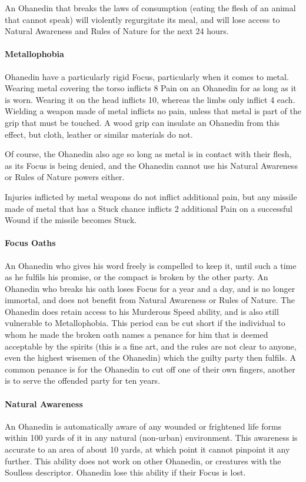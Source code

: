 \documentclass[oneside,11pt,english]{book}
\begin{document}
An Ohanedin that breaks the laws of consumption (eating the flesh of an animal that cannot speak) will violently regurgitate its meal, and will lose access to Natural Awareness and Rules of Nature for the next 24 hours.
\paragraph{Metallophobia}
Ohanedin have a particularly rigid Focus, particularly when it comes to metal. Wearing metal 
covering the torso inflicts 8 Pain on an Ohanedin for as long as it is worn. Wearing it on the head 
inflicts 10, whereas the limbs only inflict 4 each. Wielding a weapon made of metal inflicts no 
pain, unless that metal is part of the grip that must be touched. A wood grip can insulate an 
Ohanedin from this effect, but cloth, leather or similar materials do not. 


Of course, the Ohanedin also age so long as metal is in contact with their flesh, as its Focus is 
being denied, and the Ohanedin cannot use his Natural Awareness or Rules of Nature powers 
either.


Injuries inflicted by metal weapons do not inflict additional pain, but any missile made of metal that has a Stuck chance inflicts 2 additional Pain on a successful Wound if the missile becomes Stuck. 
\paragraph{Focus Oaths}
An Ohanedin who gives his word freely is compelled to keep it, until such a time as he fulfils his 
promise, or the compact is broken by the other party. An Ohanedin who breaks his oath loses 
Focus for a year and a day, and is no longer immortal, and does not benefit from Natural 
Awareness or Rules of Nature. The Ohanedin does retain access to his Murderous Speed ability, 
and is also still vulnerable to Metallophobia. This period can be cut short if the individual to 
whom he made the broken oath names a penance for him that is deemed acceptable by the spirits 
(this is a fine art, and the rules are not clear to anyone, even the highest wisemen of the 
Ohanedin) which the guilty party then fulfils. A common penance is for the Ohanedin to cut off 
one of their own fingers, another is to serve the offended party for ten years. 
\paragraph{Natural Awareness}
An Ohanedin is automatically aware of any wounded or frightened life forms within 100 yards of 
it in any natural (non-urban) environment. This awareness is accurate to an area of about 10 
yards, at which point it cannot pinpoint it any further. This ability does not work on other 
Ohanedin, or creatures with the Soulless descriptor. Ohanedin lose this ability if their Focus is lost. 
\end{document}
